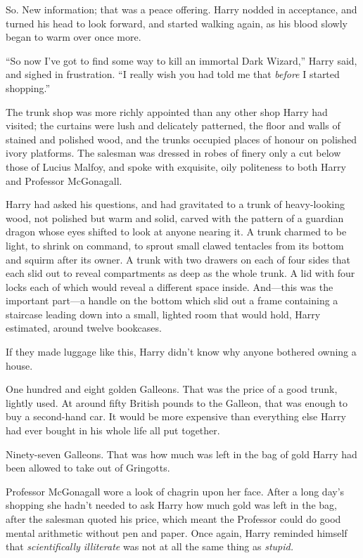 So. New information; that was a peace offering. Harry nodded in acceptance, and turned his head to look forward, and started walking again, as his blood slowly began to warm over once more.

“So now I’ve got to find some way to kill an immortal Dark Wizard,” Harry said, and sighed in frustration. “I really wish you had told me that \emph{before} I started shopping.”

\later

The trunk shop was more richly appointed than any other shop Harry had visited; the curtains were lush and delicately patterned, the floor and walls of stained and polished wood, and the trunks occupied places of honour on polished ivory platforms. The salesman was dressed in robes of finery only a cut below those of Lucius Malfoy, and spoke with exquisite, oily politeness to both Harry and Professor McGonagall.

Harry had asked his questions, and had gravitated to a trunk of heavy-looking wood, not polished but warm and solid, carved with the pattern of a guardian dragon whose eyes shifted to look at anyone nearing it. A trunk charmed to be light, to shrink on command, to sprout small clawed tentacles from its bottom and squirm after its owner. A trunk with two drawers on each of four sides that each slid out to reveal compartments as deep as the whole trunk. A lid with four locks each of which would reveal a different space inside. And—this was the important part—a handle on the bottom which slid out a frame containing a staircase leading down into a small, lighted room that would hold, Harry estimated, around twelve bookcases.

If they made luggage like this, Harry didn’t know why anyone bothered owning a house.

One hundred and eight golden Galleons. That was the price of a good trunk, lightly used. At around fifty British pounds to the Galleon, that was enough to buy a second-hand car. It would be more expensive than everything else Harry had ever bought in his whole life all put together.

Ninety-seven Galleons. That was how much was left in the bag of gold Harry had been allowed to take out of Gringotts.

Professor McGonagall wore a look of chagrin upon her face. After a long day’s shopping she hadn’t needed to ask Harry how much gold was left in the bag, after the salesman quoted his price, which meant the Professor could do good mental arithmetic without pen and paper. Once again, Harry reminded himself that \emph{scientifically illiterate} was not at all the same thing as \emph{stupid.}

